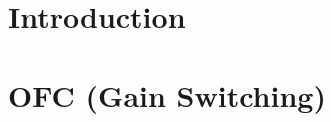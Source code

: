 \documentclass[a4paper, 11pt, oneside]{book}
\begin{document}
			\chapter{Introduction} %

%
			\chapter{OFC (Gain Switching)}

					
				
%
%
%


			
			

				
			\newpage

				\appendix

	
\end{document}
